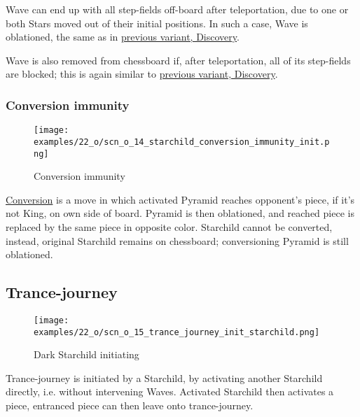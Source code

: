 Wave can end up with all step-fields off-board after teleportation, due to one or both Stars
moved out of their initial positions. In such a case, Wave is oblationed, the same as in
\hyperref[fig:scn_d_11_wave_teleported_off_board]{previous variant, Discovery}.

Wave is also removed from chessboard if, after teleportation, all of its step-fields are
blocked; this is again similar to
\hyperref[fig:scn_d_10_teleported_wave_blocked]{previous variant, Discovery}.

\clearpage %

\subsubsection*{Conversion immunity}

\vspace*{-0.9\baselineskip}
\noindent
\begin{figure}[!h]
\texttt{[image: examples/22\_o/scn\_o\_14\_starchild\_conversion\_immunity\_init.png]}
\caption{Conversion immunity}
\label{fig:scn_o_14_starchild_conversion_immunity_init}
\end{figure}

\hyperref[sec:Mayan Ascendancy/Pyramid/Conversion]{Conversion} is a move in which activated
Pyramid reaches opponent's piece, if it's not King, on own side of board. Pyramid is then
oblationed, and reached piece is replaced by the same piece in opposite color.
Starchild cannot be converted, instead, original Starchild remains on chessboard;
conversioning Pyramid is still oblationed.

\clearpage %

\subsection*{Trance-journey}

\vspace*{-0.9\baselineskip}
\noindent
\begin{wrapfigure}[11]{l}{0.4\textwidth}
\centering
\texttt{[image: examples/22\_o/scn\_o\_15\_trance\_journey\_init\_starchild.png]}
\caption{Dark Starchild initiating}
\label{fig:scn_o_15_trance_journey_init_starchild}
\end{wrapfigure}
Trance-journey is initiated by a Starchild, by activating another Starchild directly, i.e. without
intervening Waves. Activated Starchild then activates a piece, entranced piece can then leave onto
trance-journey.

